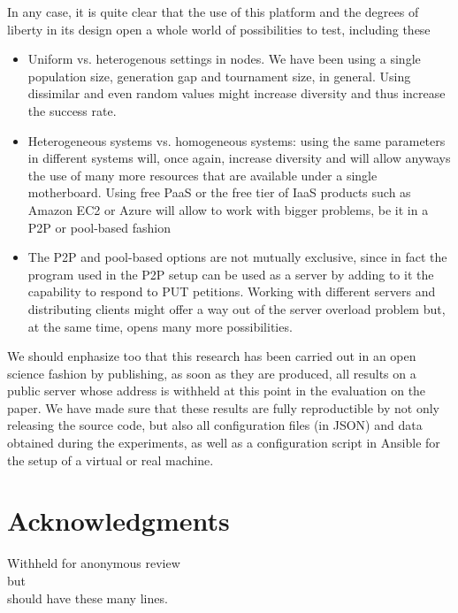 \documentclass{sig-alternate}
\begin{document}
In any case, it is quite clear that the use of this platform and the
degrees of liberty in its design open a whole world of possibilities
to test, including these \begin{itemize}
\item Uniform vs. heterogenous settings in nodes. We have been using a
  single population size, generation gap and tournament size, in
  general. Using dissimilar and even random values might increase
  diversity and thus increase the success rate.
\item Heterogeneous systems vs. homogeneous systems: using the same
  parameters in different systems will, once again, increase diversity
  and will allow anyways the use of many more resources that are
  available under a single motherboard. Using free PaaS or the free
  tier of IaaS products such as Amazon EC2 or Azure will allow to work
  with bigger problems, be it in a P2P or pool-based fashion
\item The P2P and pool-based options are not mutually exclusive, since
  in fact the program used in the P2P setup can be used as a server by
  adding to it the capability to respond to PUT petitions. Working
  with different servers and distributing clients might offer a way
  out of the server overload problem but, at the same time, opens many
  more possibilities.
\end{itemize}

We should enphasize too that this research has been carried out in an
open science fashion by publishing, as soon as they are produced, all
results on a public server whose address is withheld at this point in
the evaluation on the paper. We have made sure that these results are
fully reproductible by not only releasing the source code, but also
all configuration files (in JSON) and data obtained during the
experiments, as well as a configuration script in Ansible for the
setup of a virtual or real machine.


\section{Acknowledgments}

Withheld for anonymous review \\
but\\
should have these many lines.


%

\end{document}
